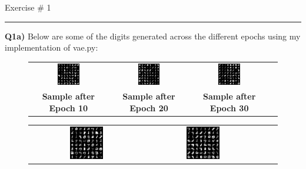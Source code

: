\documentclass{article}
\begin{document}
\begin{titlepage}
{\huge Exercise \# 1 \par}
\hrule
\vspace{0.5cm}
\textbf{Q1a)} Below are some of the digits generated across the different epochs using my implementation of vae.py:
\begin{figure} [H]
\centering
\begin{tabular}{cccc}
\includegraphics[width=0.3\textwidth]{sample_10.png} &
\includegraphics[width=0.3\textwidth]{sample_20.png} &
\includegraphics[width=0.3\textwidth]{sample_30.png} \\
\textbf{ Sample after Epoch 10 }  & \textbf{ Sample after Epoch 20 } & \textbf{ Sample after Epoch 30 }  \\[6pt]
\end{tabular}
\begin{tabular}{cccc}
\includegraphics[width=0.3\textwidth]{sample_40.png} &
\includegraphics[width=0.3\textwidth]{sample_50.png} \\

\end{tabular}
\end{figure}
\end{titlepage}
\end{document}
